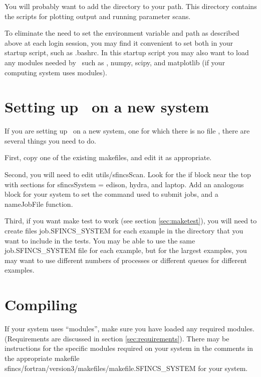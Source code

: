 You will probably want to add the directory  to your
path.  This directory contains the scripts for plotting output and running parameter scans.

To eliminate the need to set the environment variable and path 
as described above
at each login session, you may find it convenient to set both
in your startup script, such as  {\ttfamily .bashrc}.  In this startup script
you may also want to load any modules needed by \sfincsScan~such as \python, {\ttfamily numpy},
{\ttfamily scipy}, and {\ttfamily matplotlib} (if your computing system uses modules).

\section{Setting up \sfincs~on a new system}
If you are setting up \sfincs~on a new system, one for which there is no file
,
there are several things you need to do.

First, copy one of the existing makefiles, and edit it as appropriate.

Second, you will need to edit {\ttfamily utils/sfincsScan}. Look for the {\ttfamily if} block near the top
with sections for {\ttfamily sfincsSystem = edison}, {\ttfamily hydra}, and {\ttfamily laptop}. Add an analogous block
for your system to set the command used to submit jobs, and a {\ttfamily nameJobFile} function.

Third, if you want {\ttfamily make test} to work (see section \ref{sec:maketest}),
you will need to create files {\ttfamily job.SFINCS\_SYSTEM}
for each example in the  directory that you want to include
in the tests.  You may be able to use the same {\ttfamily job.SFINCS\_SYSTEM} file for each example, but for the largest examples,
you may want to use different numbers of processes or different queues for different examples.

\section{Compiling}

If your system uses ``modules'', make sure you have loaded any required modules.
(Requirements are discussed in section \ref{sec:requirements}).  
There may be
instructions for the specific modules required on your system in the comments in the
appropriate makefile \\{\ttfamily sfincs/fortran/version3/makefiles/makefile.SFINCS\_SYSTEM} for your system.

